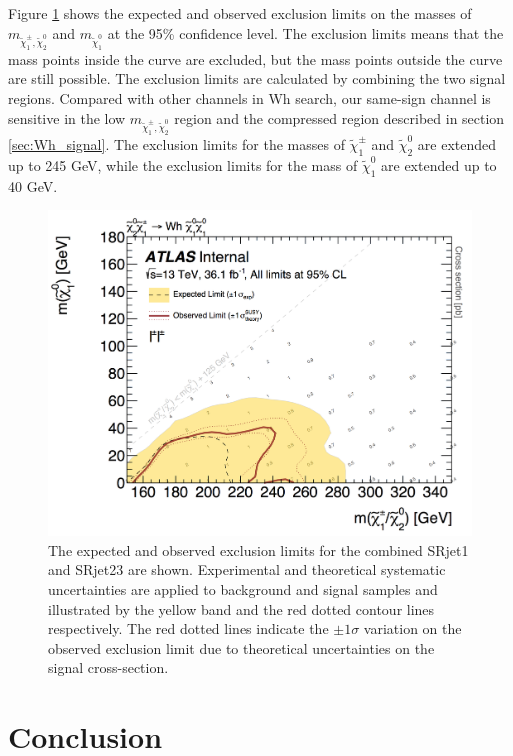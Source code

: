 Figure \ref{fig:result_exclusion_limit} shows the expected and observed exclusion limits on the masses of $m_{\tilde{\chi}_1^\pm, \tilde{\chi}_2^0}$ and $m_{\tilde{\chi}_1^0}$ at the 95\% confidence level.
The exclusion limits means that the mass points inside the curve are excluded, but the mass points outside the curve are still possible.
The exclusion limits are calculated by combining the two signal regions.
Compared with other channels in Wh search, our same-sign channel is sensitive in the low $m_{\tilde{\chi}_1^\pm, \tilde{\chi}_2^0}$ region and the compressed region described in section \ref{sec:Wh_signal}.
The exclusion limits for the masses of $\tilde{\chi}_1^\pm$ and $\tilde{\chi}_2^0$ are extended up to 245 GeV, while the exclusion limits for the mass of $\tilde{\chi}_1^0$ are extended up to 40 GeV.

\begin{figure}[htbp]
\centering
\includegraphics[width=\textwidth]{data/plot/HistFitterResults/contourPlotterWhSS_SigExt.png}
\caption{The expected and observed exclusion limits for the combined SRjet1 and SRjet23 are shown. Experimental and theoretical systematic uncertainties are applied to background and signal samples and illustrated by the yellow band and the red dotted contour lines respectively. The red dotted lines indicate the $\pm 1 \sigma$ variation on the observed exclusion limit due to theoretical uncertainties on the signal cross-section.}
\label{fig:result_exclusion_limit}
\end{figure}

\chapter{Conclusion}
\label{ch:conclusion}

